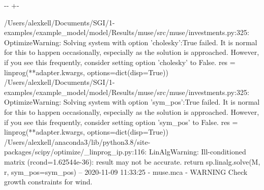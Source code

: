 \documentclass[letterpaper,10pt,english]{sphinxmanual}
\newlength\nbsphinxcodecellspacing
\begin{document}
{

\kern-\sphinxverbatimsmallskipamount\kern-\baselineskip
\kern+\FrameHeightAdjust\kern-\fboxrule
\vspace{\nbsphinxcodecellspacing}

\begin{sphinxVerbatim}[commandchars=\\\{\}]
/Users/alexkell/Documents/SGI/1-examples/example\_model/model/Results/muse/src/muse/investments.py:325: OptimizeWarning: Solving system with option 'cholesky':True failed. It is normal for this to happen occasionally, especially as the solution is approached. However, if you see this frequently, consider setting option 'cholesky' to False.
  res = linprog(**adapter.kwargs, options=dict(disp=True))
/Users/alexkell/Documents/SGI/1-examples/example\_model/model/Results/muse/src/muse/investments.py:325: OptimizeWarning: Solving system with option 'sym\_pos':True failed. It is normal for this to happen occasionally, especially as the solution is approached. However, if you see this frequently, consider setting option 'sym\_pos' to False.
  res = linprog(**adapter.kwargs, options=dict(disp=True))
/Users/alexkell/anaconda3/lib/python3.8/site-packages/scipy/optimize/\_linprog\_ip.py:116: LinAlgWarning: Ill-conditioned matrix (rcond=1.62544e-36): result may not be accurate.
  return sp.linalg.solve(M, r, sym\_pos=sym\_pos)
-- 2020-11-09 11:33:25 - muse.mca - WARNING
Check growth constraints for wind.

\end{sphinxVerbatim}
}
\end{document}
